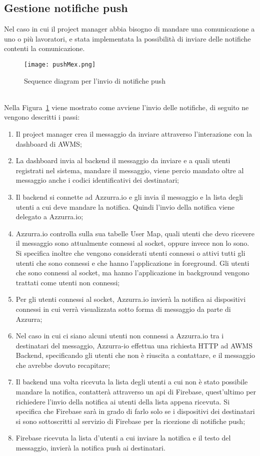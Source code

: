 \subsection{Gestione notifiche push}
Nel caso in cui il project manager abbia bisogno di mandare una comunicazione a uno o più lavoratori, e stata implementata la possibilità di inviare delle notifiche contenti la comunicazione.
\begin{figure}[h]
	\begin{center}
		\texttt{[image: pushMex.png]}
		\caption{Sequence diagram per l'invio di notifiche push}\label{fig:push}
	\end{center}
\end{figure}\\
Nella Figura~\ref{fig:push} viene mostrato come avviene l'invio delle notifiche, di seguito ne vengono descritti i passi:
\begin{enumerate}
	\item Il project manager crea il messaggio da inviare attraverso l'interazione con la dashboard di AWMS;
	\item La dashboard invia al backend il messaggio da inviare e a quali utenti registrati nel sistema, mandare il messaggio, viene percio mandato oltre al messaggio anche i codici identificativi dei destinatari;
	\item Il backend si connette ad Azzurra.io e gli invia il messaggio e la lista degli utenti a cui deve mandare la notifica. Quindi l'invio della notifica viene delegato a Azzurra.io; 
	\item Azzurra.io controlla sulla sua tabelle User Map, quali utenti che devo ricevere il messaggio sono attualmente connessi al socket, oppure invece non lo sono. Si specifica inoltre che vengono considerati utenti connessi o attivi tutti gli utenti che sono connessi e che hanno l’applicazione in foreground. Gli utenti che sono connessi al socket, ma hanno l’applicazione in background vengono trattati come utenti non connessi;
	\item Per gli utenti connessi al socket, Azzurra.io invierà la notifica ai dispositivi connessi in cui verrà visualizzata sotto forma di messaggio da parte di Azzurra;
	\item Nel caso in cui ci siano alcuni utenti non connessi a Azzurra.io tra i destinatari del messaggio, Azzurra-io effettua una richiesta HTTP ad AWMS Backend, specificando gli utenti che non è riuscita a contattare, e il messaggio che avrebbe dovuto recapitare;
	\item Il backend una volta ricevuta la lista degli utenti a cui non è stato possibile mandare la notifica, contatterà attraverso un \gls{api} di Firebase, quest'ultimo per richiedere l'invio della notifica ai utenti della lista appena ricevuta. Si specifica che Firebase sarà in grado di farlo solo se i dispositivi dei destinatari si sono sottoscritti al servizio di Firebase per la ricezione di notifiche push;
	\item Firebase ricevuta la lista d'utenti a cui inviare la notifica e il testo del messaggio, invierà la notifica push ai destinatari.
\end{enumerate}